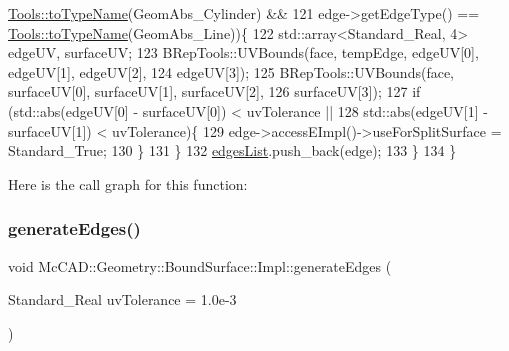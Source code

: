 \begin{DoxyCode}
      \hyperlink{namespaceMcCAD_1_1Tools_a2c3c43d2878c73f69424e7b32f87bb2b}{Tools::toTypeName}(GeomAbs\_Cylinder) &&
121                 edge->getEdgeType() == \hyperlink{namespaceMcCAD_1_1Tools_a2c3c43d2878c73f69424e7b32f87bb2b}{Tools::toTypeName}(GeomAbs\_Line))\{
122             std::array<Standard\_Real, 4> edgeUV, surfaceUV;
123             BRepTools::UVBounds(face, tempEdge, edgeUV[0], edgeUV[1], edgeUV[2],
124                     edgeUV[3]);
125             BRepTools::UVBounds(face, surfaceUV[0], surfaceUV[1], surfaceUV[2],
126                     surfaceUV[3]);
127             \textcolor{keywordflow}{if} (std::abs(edgeUV[0] - surfaceUV[0]) < uvTolerance ||
128                     std::abs(edgeUV[1] - surfaceUV[1]) < uvTolerance)\{
129                 edge->accessEImpl()->useForSplitSurface = Standard\_True;
130             \}
131         \}
132         \hyperlink{classMcCAD_1_1Geometry_1_1BoundSurface_1_1Impl_a92e901c25606e27f9d11e0837c096f59}{edgesList}.push\_back(edge);
133     \}
134 \}
\end{DoxyCode}
Here is the call graph for this function\+:
\mbox{\label{classMcCAD_1_1Geometry_1_1BoundSurface_1_1Impl_aa33a79300814d621fa5394682eb8b778}} 
\subsubsection{\texorpdfstring{generate\+Edges()}{generateEdges()}\hspace{0.1cm}{\footnotesize\ttfamily [2/2]}}
{\footnotesize\ttfamily void Mc\+C\+A\+D\+::\+Geometry\+::\+Bound\+Surface\+::\+Impl\+::generate\+Edges (\begin{DoxyParamCaption}\item[{Standard\+\_\+\+Real}]{uv\+Tolerance = {\ttfamily 1.0e-\/3} }\end{DoxyParamCaption})}

\mbox{\label{classMcCAD_1_1Geometry_1_1BoundSurface_1_1Impl_a3b3d4989cf11d9d13155106dbd5875b2}} 
